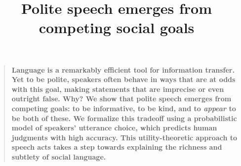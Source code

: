\documentclass[12pt]{article}
\title{Polite speech emerges from competing social goals}
\author
%
{Erica J. Yoon,$^{1\ast\dagger}$ Michael Henry Tessler,$^{1\ast}$ Noah D. Goodman,$^{1}$ Michael C. Frank$^{1}$\\
\\
\normalsize{$^{1}$Department of Psychology, Stanford University,}\\
\normalsize{450 Serra Mall, Stanford, CA 94305.}
\\
\normalsize{$^\ast$These authors contributed equally to this work.}
\\
\normalsize{$^\dagger$To whom correspondence should be addressed; E-mail: ejyoon@stanford.edu.}
}
\date{}
\newenvironment{sciabstract}{%
\begin{quote} \bf}
{\end{quote}}
\begin{document}

\baselineskip24pt


\maketitle


\begin{sciabstract}
Language is a remarkably efficient tool for information transfer. Yet to be polite, speakers often behave in ways that are at odds with this goal, making statements that are imprecise or even outright false. Why? We show that polite speech emerges from competing goals: to be informative, to be kind, and to \emph{appear} to be both of these. We formalize this tradeoff using a probabilistic model of speakers' utterance choice, which predicts human judgments with high accuracy. This utility-theoretic approach to speech acts takes a step towards explaining the richness and subtlety of social language.
\end{sciabstract}


\end{document}
